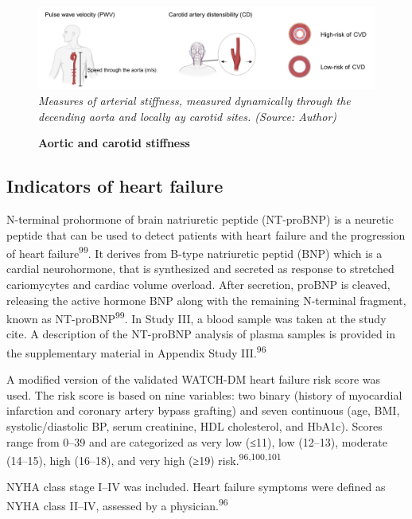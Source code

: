 \documentclass[
  a4paper,
  headsepline=true,
  open=left]{scrbook}
\begin{document}
\begin{figure}

{\centering 

\includegraphics{images/Methods_arterial_stiffness.pdf} \emph{Measures
of arterial stiffness, measured dynamically through the decending aorta
and locally ay carotid sites. (Source: Author)}

}

\caption{\label{fig-as}\textbf{Aortic and carotid stiffness}}

\end{figure}

\hypertarget{indicators-of-heart-failure}{%
\subsection{Indicators of heart
failure}\label{indicators-of-heart-failure}}

N-terminal prohormone of brain natriuretic peptide (NT-proBNP) is a
neuretic peptide that can be used to detect patients with heart failure
and the progression of heart failure\textsuperscript{99}. It derives
from B-type natriuretic peptid (BNP) which is a cardial neurohormone,
that is synthesized and secreted as response to stretched cariomycytes
and cardiac volume overload. After secretion, proBNP is cleaved,
releasing the active hormone BNP along with the remaining N-terminal
fragment, known as NT-proBNP\textsuperscript{99}. In Study III, a blood
sample was taken at the study cite. A description of the NT-proBNP
analysis of plasma samples is provided in the supplementary material in
Appendix Study III.\textsuperscript{96}

A modified version of the validated WATCH-DM heart failure risk score
was used. The risk score is based on nine variables: two binary (history
of myocardial infarction and coronary artery bypass grafting) and seven
continuous (age, BMI, systolic/diastolic BP, serum creatinine, HDL
cholesterol, and HbA1c). Scores range from 0--39 and are categorized as
very low (≤11), low (12--13), moderate (14--15), high (16--18), and very
high (≥19) risk.\textsuperscript{96,100,101}

NYHA class stage I--IV was included. Heart failure symptoms were defined
as NYHA class II--IV, assessed by a physician.\textsuperscript{96}
\end{document}
